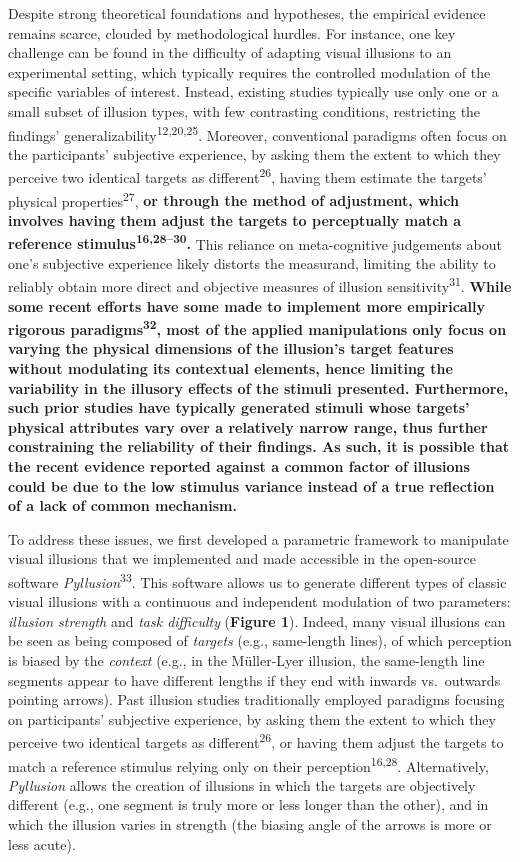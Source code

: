 \documentclass[
  man,floatsintext]{apa6}
\begin{document}
Despite strong theoretical foundations and hypotheses, the empirical evidence remains scarce, clouded by methodological hurdles. For instance, one key challenge can be found in the difficulty of adapting visual illusions to an experimental setting, which typically requires the controlled modulation of the specific variables of interest. Instead, existing studies typically use only one or a small subset of illusion types, with few contrasting conditions, restricting the findings' generalizability\textsuperscript{12,20,25}. Moreover, conventional paradigms often focus on the participants' subjective experience, by asking them the extent to which they perceive two identical targets as different\textsuperscript{26}, having them estimate the targets' physical properties\textsuperscript{27}, \textbf{or through the method of adjustment, which involves having them adjust the targets to perceptually match a reference stimulus\textsuperscript{16,28--30}.} This reliance on meta-cognitive judgements about one's subjective experience likely distorts the measurand, limiting the ability to reliably obtain more direct and objective measures of illusion sensitivity\textsuperscript{31}.
\textbf{While some recent efforts have some made to implement more empirically rigorous paradigms\textsuperscript{32}, most of the applied manipulations only focus on varying the physical dimensions of the illusion's target features without modulating its contextual elements, hence limiting the variability in the illusory effects of the stimuli presented. Furthermore, such prior studies have typically generated stimuli whose targets' physical attributes vary over a relatively narrow range, thus further constraining the reliability of their findings. As such, it is possible that the recent evidence reported against a common factor of illusions could be due to the low stimulus variance instead of a true reflection of a lack of common mechanism.}

To address these issues, we first developed a parametric framework to manipulate visual illusions that we implemented and made accessible in the open-source software \emph{Pyllusion}\textsuperscript{33}. This software allows us to generate different types of classic visual illusions with a continuous and independent modulation of two parameters: \emph{illusion strength} and \emph{task difficulty} (\textbf{Figure 1}). Indeed, many visual illusions can be seen as being composed of \emph{targets} (e.g., same-length lines), of which perception is biased by the \emph{context} (e.g., in the Müller-Lyer illusion, the same-length line segments appear to have different lengths if they end with inwards vs.~outwards pointing arrows). Past illusion studies traditionally employed paradigms focusing on participants' subjective experience, by asking them the extent to which they perceive two identical targets as different\textsuperscript{26}, or having them adjust the targets to match a reference stimulus relying only on their perception\textsuperscript{16,28}. Alternatively, \emph{Pyllusion} allows the creation of illusions in which the targets are objectively different (e.g., one segment is truly more or less longer than the other), and in which the illusion varies in strength (the biasing angle of the arrows is more or less acute).
\end{document}
